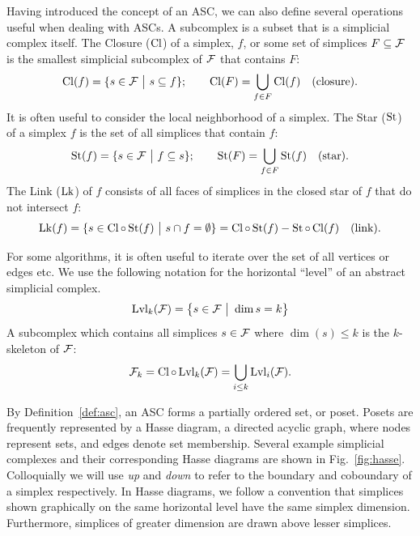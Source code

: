 \par Having introduced the concept of an ASC, we can also define several operations useful when dealing with ASCs. A subcomplex is a subset that is a simplicial complex itself. The Closure ($\operatorname{Cl}$) of a simplex, $f$, or some set of simplices $F \subseteq \mathcal{F}$ is the smallest simplicial subcomplex of $\mathcal{F}$ that contains $F$:
\begin{equation}
	\operatorname{Cl}(f) = \{s \in \mathcal{F} \ \big| \  s \subseteq f\};\qquad \operatorname{Cl}(F) = \bigcup\limits_{f\in F} \operatorname{Cl}(f) \quad\mathrm{(closure)}.
	\label{eq:closure}
\end{equation}
It is often useful to consider the local neighborhood of a simplex. The Star ($\operatorname{St}$) of a simplex $f$ is the set of all simplices that contain $f$:
\begin{equation}
	\operatorname{St}(f) = \{s \in \mathcal{F} \ \big| \  f \subseteq s\}; \qquad \operatorname{St}(F) = \bigcup\limits_{f \in F} \operatorname{St}(f) \quad\mathrm{(star)}.
	\label{eq:star}
\end{equation}
The Link ($\operatorname{Lk}$) of $f$ consists of all faces of simplices in the closed star of $f$ that do not intersect $f$:
\begin{equation}
	\operatorname{Lk}(f) = \{s \in \operatorname{Cl} \circ \operatorname{St}(f) \ \big| \  s\cap f = \emptyset \} = \operatorname{Cl}\circ\operatorname{St}(f) - \operatorname{St}\circ\operatorname{Cl}(f) \quad\mathrm{(link)}.
	\label{eq:link}
\end{equation}

For some algorithms, it is often useful to iterate over the set of all vertices or edges etc. We use the following notation for the horizontal ``level'' of an abstract simplicial complex.
\begin{equation}
	\operatorname{Lvl}_k(\mathcal{F}) = \left\{ s \in \mathcal{F} \ \big| \  \dim{s} = k \right\}
\end{equation}
A subcomplex which contains all simplices $s \in \mathcal{F}$ where $\dim(s) \leq k$ is the $k$-skeleton of $\mathcal{F}$:
\begin{equation}
	\mathcal{F}_k = \operatorname{Cl}\circ\operatorname{Lvl}_k(\mathcal{F}) = \bigcup\limits_{i\leq k} \operatorname{Lvl}_i(\mathcal{F}).
\end{equation}

\par By Definition~\ref{def:asc}, an ASC forms a partially ordered set, or poset.
Posets are frequently represented by a Hasse diagram, a directed acyclic graph, where nodes represent sets, and edges denote set membership.
Several example simplicial complexes and their corresponding Hasse diagrams are shown in Fig.~\ref{fig:hasse}.
Colloquially we will use \textit{up} and \textit{down} to refer to the boundary and coboundary of a simplex respectively.
In Hasse diagrams, we follow a convention that simplices shown graphically on the same horizontal level have the same simplex dimension.
Furthermore, simplices of greater dimension are drawn above lesser simplices.

